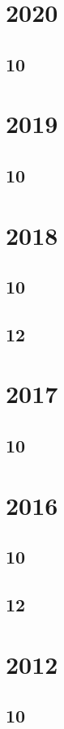 \documentclass[11pt]{book}
\begin{document}
\section{2020}
\subsection{10}

\section{2019}
\subsection{10}

\section{2018}
\subsection{10}

\subsection{12}

\section{2017}
\subsection{10}




\section{2016}
\subsection{10}

\subsection{12}

\section{2012}
\subsection{10}

\end{document}
